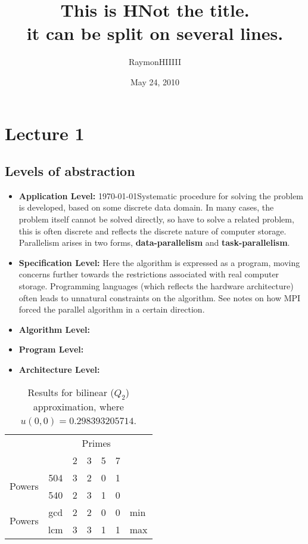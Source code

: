 \documentclass[12pt,a4paper]{article}
\begin{document}
\title{This is HNot the title. \\ it can be split on several lines.}
\author{RaymonHIIIII}
\date{May 24, 2010}
\maketitle
 
\section*{Lecture 1}
\subsection*{Levels of abstraction}

\begin{itemize}
  \item \textbf{Application Level:} \today Systematic procedure for solving the problem is developed, based on some discrete data domain. In many cases, the problem itself cannot be solved directly, so have to solve a related problem, this is often discrete and reflects the discrete nature of computer storage. Parallelism arises in two forms, \textbf{data-parallelism} and \textbf{task-parallelism}.
   \item \textbf{Specification Level:} Here the algorithm is expressed as a program, moving concerns further towards the restrictions associated with real computer storage. Programming languages (which reflects the hardware architecture) often leads to unnatural constraints on the algorithm. See notes on how MPI forced the parallel algorithm in a certain direction. \cite{duffy}
   \item \textbf{Algorithm Level:}
   \item \textbf{Program Level:}
   \item \textbf{Architecture Level:}
 \end{itemize}
 
 \begin{table}[ht]
 \begin{center}
 \begin{tabular}{cc|c|c|c|c|l}
 \cline{3-6}
 & & \multicolumn{4}{|c|}{Primes} \\ 
 \cline{3-6}
 & & 2 & 3 & 5 & 7 \\ 
 \cline{1-6}
 \multicolumn{1}{|c|}{\multirow{2}{*}{Powers}} & \multicolumn{1}{|c|}{504} & 3 & 2 & 0 & 1 & \\ 
 \cline{2-6}
 \multicolumn{1}{|c|}{}                        & \multicolumn{1}{|c|}{540} & 2 & 3 & 1 & 0 & \\ 
 \cline{1-6}
 \multicolumn{1}{|c|}{\multirow{2}{*}{Powers}} & \multicolumn{1}{|c|}{gcd} & 2 & 2 & 0 & 0 & min \\
 \cline{2-6}
 \multicolumn{1}{|c|}{}                        & \multicolumn{1}{|c|}{lcm} & 3 & 3 & 1 & 1 & max \\
 \cline{1-6}
 \end{tabular}
 \end{center}
 \caption{Results for bilinear ($Q_2$) approximation, where $u(0,0) = 0.298393205714$.}
 \label{table:lable1}
 \end{table}
  
\end{document}
